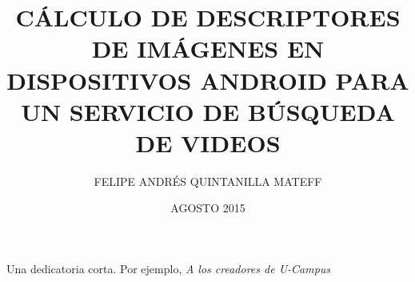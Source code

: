 \documentclass[upright, contnum]{umemoria}
\author{FELIPE ANDRÉS QUINTANILLA MATEFF}
\title{CÁLCULO DE DESCRIPTORES DE IMÁGENES EN DISPOSITIVOS ANDROID PARA UN SERVICIO DE BÚSQUEDA DE VIDEOS}
\date{AGOSTO 2015}
\begin{document}
\frontmatter
\maketitle

\begin{abstract}
{\lipsum[1-4]}
\end{abstract}

\begin{dedicatoria} %
Una dedicatoria corta. Por ejemplo, \emph{A los creadores de U-Campus}
\end{dedicatoria}

\begin{thanks} %
\lipsum[1-2]
\end{thanks}
\cleardoublepage

\tableofcontents
\listoftables %
\listoffigures %

\mainmatter













\end{document}
